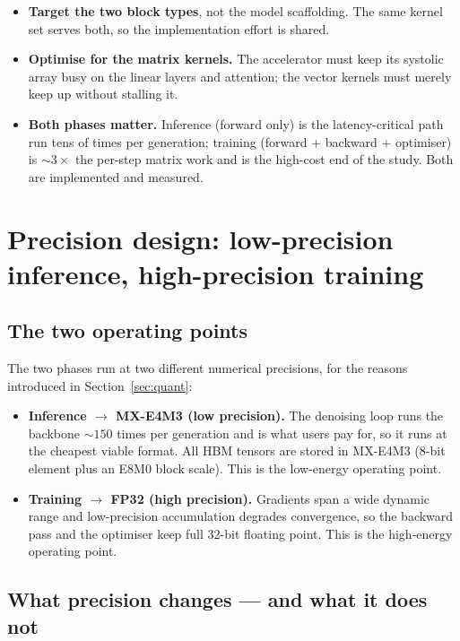 \documentclass[11pt]{report}
\begin{document}
\begin{itemize}
\item \textbf{Target the two block types}, not the model scaffolding. The
same kernel set serves both, so the implementation effort is shared.
\item \textbf{Optimise for the matrix kernels.} The accelerator must keep
its systolic array busy on the linear layers and attention; the vector
kernels must merely keep up without stalling it.
\item \textbf{Both phases matter.} Inference (forward only) is the
latency-critical path run tens of times per generation; training (forward
+ backward + optimiser) is ${\sim}3\times$ the per-step matrix work and is
the high-cost end of the study. Both are implemented and measured.
\end{itemize}

\section{Precision design: low-precision inference, high-precision training}
\label{sec:precision-design}

\subsection{The two operating points}

The two phases run at two different numerical precisions, for the reasons
introduced in Section~\ref{sec:quant}:

\begin{itemize}
\item \textbf{Inference $\to$ MX-E4M3 (low precision).} The denoising loop
runs the backbone ${\sim}150$ times per generation and is what users pay
for, so it runs at the cheapest viable format. All HBM tensors are stored
in MX-E4M3 (8-bit element plus an E8M0 block scale). This is the
low-energy operating point.
\item \textbf{Training $\to$ FP32 (high precision).} Gradients span a wide
dynamic range and low-precision accumulation degrades convergence, so the
backward pass and the optimiser keep full 32-bit floating point. This is
the high-energy operating point.
\end{itemize}

\subsection{What precision changes --- and what it does not}
\end{document}
